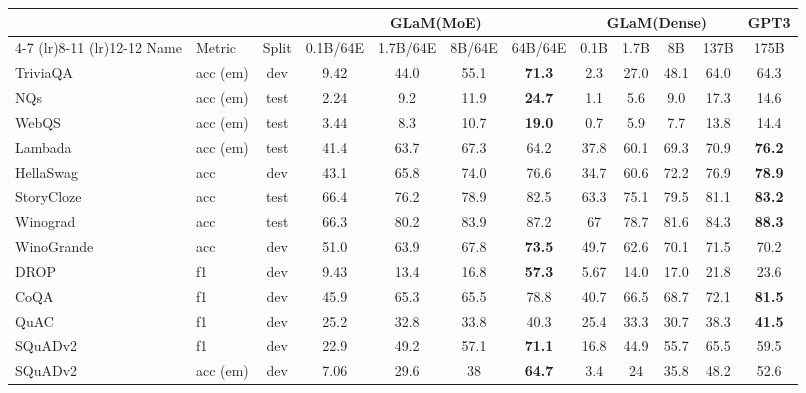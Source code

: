 \documentclass{article}
\newcommand{\glam}{GLaM\xspace}
\begin{document}
\begin{table*}[htb]
    \centering
    \renewcommand{\arraystretch}{1.4}
            \caption{Zero-shot scores on all 29 benchmarks for GPT3 and different \glam MoE and dense models.}
            \vskip 0.1in
        \label{tab:0shot}
    \footnotesize
    \begin{tabular}{llcccccccccc}
        \toprule
        & & & \multicolumn{4}{c}{\bf \glam(MoE)} & \multicolumn{4}{c}{\bf \glam(Dense)} & {\bf GPT3}\\
        \cmidrule(lr){4-7} \cmidrule(lr){8-11} \cmidrule(lr){12-12}
        Name & Metric & Split & 0.1B/64E & 1.7B/64E & 8B/64E & 64B/64E & 0.1B & 1.7B & 8B & 137B & 175B\\
        \midrule
        TriviaQA & acc (em) & dev & 9.42 & 44.0 & 55.1 & \textbf{71.3} & 2.3 & 27.0 & 48.1 & 64.0 & 64.3\\
        NQs & acc (em) & test & 2.24 & 9.2 & 11.9 & \textbf{24.7} & 1.1 & 5.6 & 9.0 & 17.3 & 14.6\\
        WebQS & acc (em) & test & 3.44 & 8.3 & 10.7 & \textbf{19.0} & 0.7 & 5.9 & 7.7 & 13.8 & 14.4\\
        \addlinespace
        Lambada & acc (em) & test & 41.4 & 63.7 & 67.3 & 64.2 & 37.8 & 60.1 & 69.3 & 70.9 & \textbf{76.2}\\
        HellaSwag & acc & dev & 43.1 & 65.8 & 74.0 & 76.6 & 34.7 & 60.6 & 72.2 & 76.9 & \textbf{78.9}\\
        StoryCloze & acc & test & 66.4 & 76.2 & 78.9 & 82.5 & 63.3& 75.1& 79.5& 81.1& \textbf{83.2}\\
        \addlinespace
        Winograd & acc & test & 66.3 & 80.2 & 83.9 & 87.2 & 67 & 78.7& 81.6& 84.3& \textbf{88.3}\\
        WinoGrande & acc & dev & 51.0& 63.9& 67.8& \textbf{73.5}& 49.7& 62.6& 70.1& 71.5& 70.2\\
        \addlinespace
        DROP & f1 & dev & 9.43& 13.4& 16.8& \textbf{57.3} & 5.67 & 14.0 & 17.0& 21.8& 23.6\\
        CoQA & f1 & dev& 45.9 & 65.3 & 65.5 & 78.8 & 40.7 & 66.5& 68.7& 72.1& \textbf{81.5}\\
        QuAC & f1 & dev & 25.2& 32.8& 33.8& 40.3 & 25.4 & 33.3 & 30.7 & 38.3 & \textbf{41.5}\\
        SQuADv2 & f1 & dev & 22.9 & 49.2 & 57.1 & \textbf{71.1} & 16.8 & 44.9 & 55.7 & 65.5 & 59.5\\
        SQuADv2 & acc (em) & dev & 7.06 & 29.6 & 38 & \textbf{64.7} & 3.4 & 24 & 35.8 & 48.2 & 52.6\\

\end{tabular}
\end{table*}
\end{document}
